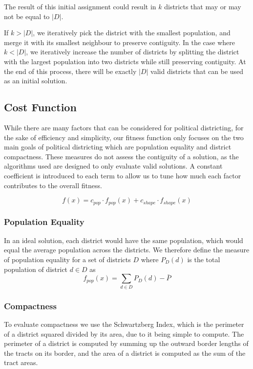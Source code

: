 \documentclass[journal]{IEEEtran}
\begin{document}
The result of this initial assignment could result in $k$ districts that may or
may not be equal to $|D|$.

If $k > |D|$, we iteratively pick the district with the smallest population, and
merge it with its smallest neighbour to preserve contiguity. In the case where
$k < |D|$, we iteratively increase the number of districts by splitting the
district with the largest population into two districts while still preserving
contiguity. At the end of this process, there will be exactly $|D|$ valid
districts that can be used as an initial solution.

\subsection{Cost Function}
While there are many factors that can be considered for political districting,
for the sake of efficiency and simplicity, our fitness function only focuses on
the two main goals of political districting which are population equality and
district compactness.  These measures do not assess the contiguity of a
solution, as the algorithms used are designed to only evaluate valid solutions.
A constant coefficient is introduced to each term to allow us to tune how much
each factor contributes to the overall fitness.

$$f(x) = c_{pop} \cdot f_{pop}(x) + c_{shape} \cdot f_{shape}(x)$$

\subsubsection{Population Equality}
In an ideal solution, each district would have the same population, which would
equal the average population across the districts.  We therefore define the
measure of population equality for a set of districts $D$ where $P_D(d)$ is the
total population of district $d \in D$ as
$$f_{pop}(x) = \sum_{d \in D} P_D(d) - \bar{P}$$

\subsubsection{Compactness}
To evaluate compactness we use the Schwartzberg Index\cite{schwartzberg}, which
is the perimeter of a district squared divided by its area, due to it being
simple to compute.  The perimeter of a district is computed by summing up the
outward border lengths of the tracts on its border, and the area of a district
is computed as the sum of the tract areas.
\end{document}
